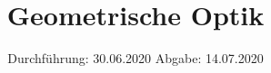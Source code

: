 

\subject{Versuch Nr. 408}
\title{Geometrische Optik}
\date{%
  Durchführung: 30.06.2020
  \hspace{3em}
  Abgabe: 14.07.2020
}


\setlength{\parindent}{0pt} %

\maketitle
\thispagestyle{empty}
\tableofcontents
\newpage








\printbibliography{}


